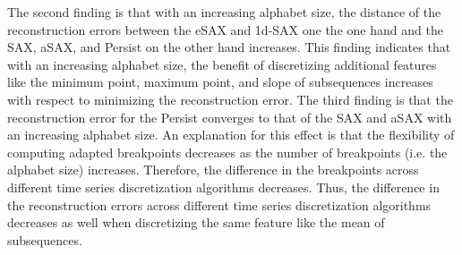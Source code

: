 The second finding is that with an increasing alphabet size, the distance of the reconstruction errors between the \ac{eSAX} and \ac{1d-SAX} one the one hand and the \ac{SAX}, \ac{aSAX}, and Persist on the other hand increases. This finding indicates that with an increasing alphabet size, the benefit of discretizing additional features like the minimum point, maximum point, and slope of subsequences increases with respect to minimizing the reconstruction error. \newline
The third finding is that the reconstruction error for the Persist converges to that of the \ac{SAX} and \ac{aSAX} with an increasing alphabet size. An explanation for this effect is that the flexibility of computing adapted breakpoints decreases as the number of breakpoints (i.e. the alphabet size) increases. Therefore, the difference in the breakpoints across different time series discretization algorithms decreases. Thus, the difference in the reconstruction errors across different time series discretization algorithms decreases as well when discretizing the same feature like the mean of subsequences.